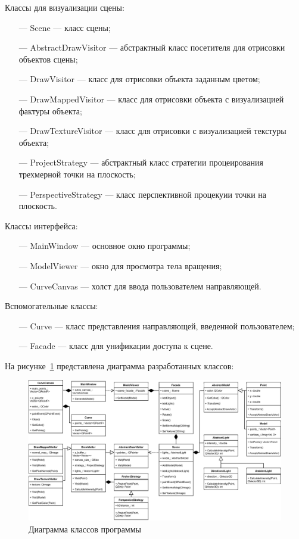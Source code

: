 Классы для визуализации сцены:
\begin{itemize}
    \item[---] Scene --- класс сцены;
    \item[---] AbstractDrawVisitor --- абстрактный класс посетителя для отрисовки объектов сцены;
    \item[---] DrawVisitor --- класс для отрисовки объекта заданным цветом;
    \item[---] DrawMappedVisitor --- класс для отрисовки объекта с визуализацией фактуры объекта;
    \item[---] DrawTextureVisitor --- класс для отрисовки с визуализацией текстуры объекта;
    \item[---] ProjectStrategy --- абстрактный класс стратегии процеирования трехмерной точки на плоскость;
    \item[---] PerspectiveStrategy --- класс перспективной процекуии точки на плоскость.
\end{itemize}

Классы интерфейса:
\begin{itemize}
    \item[---] MainWindow --- основное окно программы;
    \item[---] ModelViewer --- окно для просмотра тела вращения;
    \item[---] CurveCanvas --- холст для ввода пользователем направляющей.
\end{itemize}
Вспомогательные классы:
\begin{itemize}
    \item[---] Curve --- класс представления направляющей, введенной пользователем;
    \item[---] Facade --- класс для унификации доступа к сцене.
\end{itemize}

На рисунке~\ref{fig:classes} представлена диаграмма разработанных классов:
\begin{figure}[H]
	\centering
	\includegraphics[scale=0.5]{img/classes.eps}
	\caption{Диаграмма классов программы}
	\label{fig:classes}
\end{figure}

